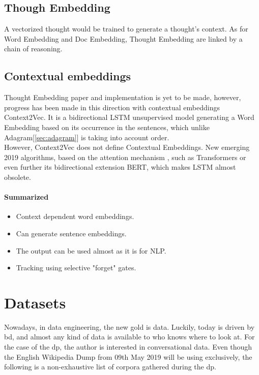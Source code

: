 \subsection{Though Embedding}
\label{sota:though-embedding}
A vectorized thought would be trained to generate a thought's context. As for Word Embedding and Doc Embedding,  Thought Embedding are linked by a chain of reasoning.

\subsection{Contextual embeddings}
\label{sota:contextual-embedding}
Thought Embedding paper and implementation is yet to be made, however, progress has been made in this direction with contextual embeddings Context2Vec\cite{article:context2vec}. It is a bidirectional LSTM\cite{article:lstm} unsupervised model generating a Word Embedding based on its occurrence in the sentences, which unlike Adagram[\ref{sec:adagram}] is taking into account order. \\


However, Context2Vec does not define Contextual Embeddings. New emerging 2019 algorithms, based on the attention mechanism \cite{article:attention-is-all-you-need}, such as Transformers\cite{article:transformer} or even further its bidirectional extension BERT\cite{article:bert}, which makes LSTM almost obsolete.

\paragraph{Summarized}
\begin{itemize}
    \setlength\itemsep{0em}
    \item Context dependent word embeddings.
    \item Can generate sentence embeddings.
    \item The output can be used almost as it is for NLP.
    \item Tracking using selective "forget" gates.
\end{itemize}


\section{Datasets}
\label{sota:datasets}
Nowadays, in data engineering, the new gold is data. Luckily, today is driven by \gls{bd}, and almost any kind of data is available to who knows where to look at. For the case of the \gls{dp}, the author is interested in conversational data. Even though the English Wikipedia Dump from 09th May 2019 will be using exclusively, the following is a non-exhaustive list of corpora gathered during the \gls{dp}.

